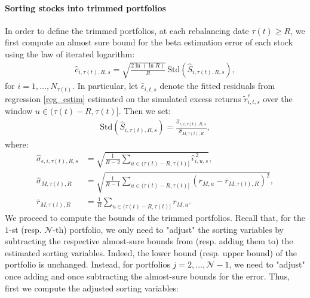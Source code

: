 \paragraph{Sorting stocks into trimmed portfolios} In order to define the trimmed portfolios, at each rebalancing date $\tau(t) \geq R$, we first compute an almost sure bound for the beta estimation error of each stock using the law of iterated logarithm:
\begin{align*}
    \widehat{c}_{i,\tau(t),R,s} = \sqrt{\frac{2 \ln\!\left(\ln R\right)}{R}}\,\text{Std}\!\left(\widehat{S}_{i,\tau(t),R,s}\right),
\end{align*}
for $i=1, \dots, N_{\tau(t)}$. In particular, let $\widehat{\epsilon}_{i,t,s}$ denote the fitted residuals from regression \eqref{reg_estim} estimated on the simulated excess returns $\widetilde{r}_{i,t,s}^e$ over the window $u \in (\tau(t)-R,\tau(t)]$. Then we set:
\begin{align*}
    \text{Std}\!\left(\widehat{S}_{i,\tau(t),R,s}\right) = \frac{\widehat{\sigma}_{\epsilon,i,\tau(t),R,s}}{\widehat{\sigma}_{M,\tau(t),R}},
\end{align*}
where:
\begin{align*}
    \widehat{\sigma}_{\epsilon,i,\tau(t),R,s} &= \sqrt{\frac{1}{R-2}\sum_{u \in (\tau(t)-R,\tau(t)]}\widehat{\epsilon}_{i,u,s}^{\,2}},\\
    \widehat{\sigma}_{M,\tau(t),R} &= \sqrt{\frac{1}{R-1}\sum_{u \in (\tau(t)-R,\tau(t)]}\left(r_{M,u}-\overline{r}_{M,\tau(t),R}\right)^2},\\
    \overline{r}_{M,\tau(t),R} &= \frac{1}{R}\sum_{u \in (\tau(t)-R,\tau(t)]} r_{M,u}.
\end{align*}
We proceed to compute the bounds of the trimmed portfolios. Recall that, for the $1$-st (resp. $\mathcal{N}$-th) portfolio, we only need to "adjust" the sorting variables by subtracting the respective almost-sure bounds from (resp. adding them to) the estimated sorting variables. Indeed, the lower bound (resp. upper bound) of the portfolio is unchanged. Instead, for portfolios $j=2,\dots,\mathcal{N}-1$, we need to "adjust" once adding and once subtracting the almost-sure bounds for the error. Thus, first we compute the adjusted sorting variables:
